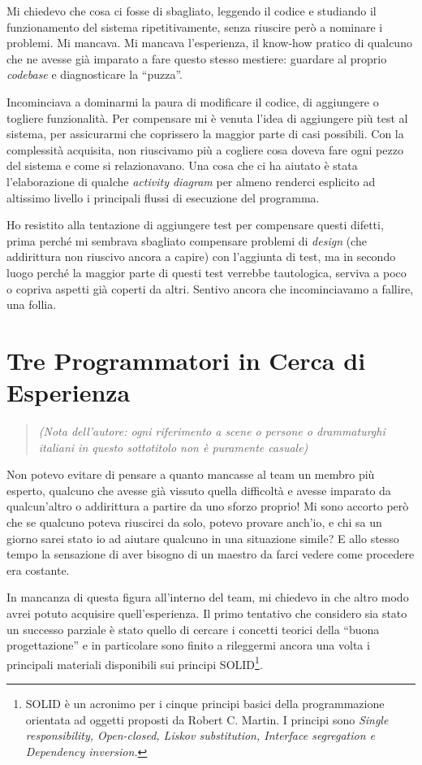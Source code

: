 \documentclass[12pt]{report}
\begin{document}
Mi chiedevo che cosa ci fosse di sbagliato, leggendo il codice e studiando il 
funzionamento del sistema ripetitivamente, senza riuscire però
a nominare i problemi. Mi mancava. Mi mancava l'esperienza, il know-how pratico
di qualcuno che ne avesse già imparato a fare questo stesso mestiere: guardare al 
proprio \textit{codebase} e diagnosticare la ``puzza''. 

Incominciava a dominarmi la paura di modificare il codice, di aggiungere o 
togliere funzionalità. Per compensare mi è venuta l'idea di aggiungere più test
al sistema, per assicurarmi che coprissero la maggior parte di casi possibili.
Con la complessità acquisita, non riuscivamo più a cogliere cosa doveva fare 
ogni pezzo del sistema e come si relazionavano. Una cosa che ci ha aiutato è
stata l'elaborazione di qualche \textit{activity diagram} per almeno renderci 
esplicito ad altissimo livello i principali flussi di esecuzione del programma. 

Ho resistito alla tentazione di aggiungere test per compensare questi difetti,
prima perché mi sembrava sbagliato compensare problemi di \textit{design} (che
addirittura non riuscivo ancora a capire) con l'aggiunta
di test, ma in secondo luogo perché la maggior parte di questi test verrebbe
tautologica, serviva a poco o copriva aspetti già coperti da altri. 
Sentivo ancora che incominciavamo a fallire, una follia.

\section{Tre Programmatori in Cerca di Esperienza}

\begin{quote}
\textit{
(Nota dell'autore: ogni riferimento a scene o persone o drammaturghi italiani
in questo sottotitolo non è puramente casuale)
}
\end{quote}

Non potevo evitare di pensare a quanto mancasse al team un membro più esperto,
qualcuno che avesse già vissuto quella difficoltà e avesse imparato 
da qualcun'altro o addirittura a partire da uno sforzo proprio! 
Mi sono accorto però che se qualcuno poteva riuscirci da solo, potevo provare
anch'io, e chi sa un giorno sarei stato io ad aiutare qualcuno in una situazione 
simile? E allo stesso tempo la sensazione di aver bisogno di un maestro da farci
vedere come procedere era costante.

In mancanza di questa figura all'interno del team, mi chiedevo in che altro modo 
avrei potuto acquisire quell'esperienza. Il primo tentativo 
che considero sia stato un successo parziale è stato quello di 
cercare i concetti teorici della ``buona progettazione'' 
e in particolare sono finito a rileggermi ancora una volta 
i principali materiali disponibili sui principi SOLID\footnote{
SOLID è un acronimo per i cinque principi basici della programmazione
orientata ad oggetti proposti da Robert C. Martin. I principi sono \textit{
Single
responsibility, Open-closed, Liskov substitution, 
Interface segregation e Dependency inversion.
}
}. 
\end{document}
